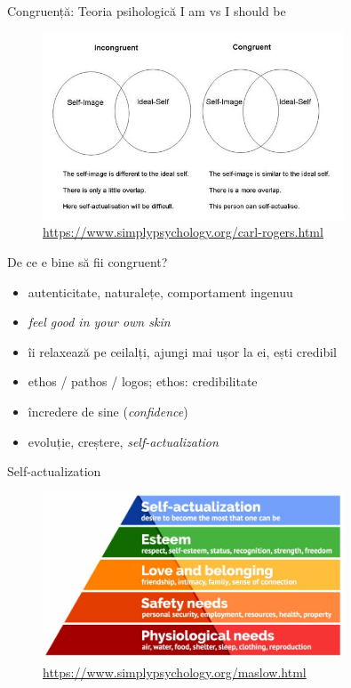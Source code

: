 \documentclass{simple}
\begin{document}
\begin{frame}{Congruență: Teoria psihologică}
  \centering
  \pause
  \Large{I am vs I should be}
  \pause
  \begin{figure}
    \centering
    \includegraphics[width=0.8\textwidth]{img/congruence}\\
    \scriptsize{\url{https://www.simplypsychology.org/carl-rogers.html}}
  \end{figure}
\end{frame}

\begin{frame}{De ce e bine să fii congruent?}
  \begin{itemize}
    \pause
    \item autenticitate, naturalețe, comportament ingenuu
    \pause
    \item \textit{feel good in your own skin}
    \pause
    \item îi relaxează pe ceilalți, ajungi mai ușor la ei, ești credibil
    \pause
    \item ethos / pathos / logos; ethos: credibilitate
    \pause
    \item încredere de sine (\textit{confidence})
    \pause
    \item evoluție, creștere, \textit{self-actualization}
  \end{itemize}
\end{frame}

\begin{frame}{Self-actualization}
  \begin{figure}
    \centering
    \includegraphics[width=0.8\textwidth]{img/maslow-hierarchy-of-needs}\\
    \scriptsize{\url{https://www.simplypsychology.org/maslow.html}}
  \end{figure}
\end{frame}
\end{document}
